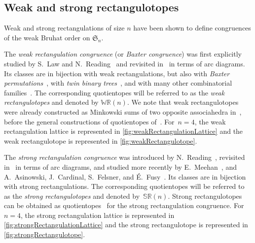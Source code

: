 \documentclass{amsart}
\theoremstyle{definition}
\newcommand{\f}[1]{\mathfrak{#1}} %
\newcommand{\darkblue}{\color{darkblue}} %
\newcommand{\defn}[1]{\textsl{\darkblue #1}} %
\newcommand{\polytope}[1]{\mathds{#1}} %
\newcommand{\WRP}{\polytope{WR}} %
\newcommand{\SRP}{\polytope{SR}} %
\begin{document}

\subsection{Weak and strong rectangulotopes}

Weak and strong rectangulations of size $n$ have been shown to define congruences of the weak Bruhat order on $\f{S}_n$.

The \defn{weak rectangulation congruence} (or \defn{Baxter congruence}) was first explicitly studied by S.~Law and N.~Reading~\cite{MR2871762} and revisited in~\cite[Thm.~1.1 \& Exm.~4.10]{Reading-arcDiagrams} in terms of arc diagrams.
Its classes are in bijection with weak rectangulations, but also with \defn{Baxter permutations}~\cite{MR0491652,MR0555815}, with \defn{twin binary trees}~\cite{MR1417289,MR2914637}, and with many other combinatorial families~\cite{MR2763051}. 
The corresponding quotientopes will be referred to as the \defn{weak rectangulotopes} and denoted by $\WRP(n)$.
We note that weak rectangulotopes were already constructed as Minkowski sums of two opposite associahedra in~\cite{MR2871762}, before the general constructions of quotientopes of~\cite{MR3964495,MR4584712}.
For~$n = 4$, the weak rectangulation lattice is represented in \cref{fig:weakRectangulationLattice} and the weak rectangulotope is represented in \cref{fig:weakRectangulotope}.

The \defn{strong rectangulation congruence} was introduced by N.~Reading~\cite{MR2864445}, revisited in~\cite[Thm.~1.2 \& Exm.~4.11]{Reading-arcDiagrams} in terms of arc diagrams, and studied more recently by E.~Meehan~\cite{MR3697823}, and A.~Asinowski, J.~Cardinal, S.~Felsner, and É.~Fusy~\cite{ACFF24}.
Its classes are in bijection with strong rectangulations.
The corresponding quotientopes will be referred to as the \defn{strong rectangulotopes} and denoted by~$\SRP(n)$.
Strong rectangulotopes can be obtained as quotientopes~\cite{MR3964495,MR4584712} for the strong rectangulation congruence.
For~$n = 4$, the strong rectangulation lattice is represented in \cref{fig:strongRectangulationLattice} and the strong rectangulotope is represented in \cref{fig:strongRectangulotope}.
\end{document}

